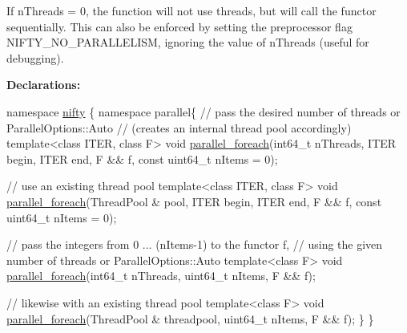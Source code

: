 If {\ttfamily n\+Threads = 0}, the function will not use threads, but will call the functor sequentially. This can also be enforced by setting the preprocessor flag {\ttfamily N\+I\+F\+T\+Y\+\_\+\+N\+O\+\_\+\+P\+A\+R\+A\+L\+L\+E\+L\+I\+SM}, ignoring the value of {\ttfamily n\+Threads} (useful for debugging).

{\bfseries  Declarations\+:}


\begin{DoxyCode}
\textcolor{keyword}{namespace }\hyperlink{namespacenifty}{nifty} \{
\textcolor{keyword}{namespace }parallel\{
    \textcolor{comment}{// pass the desired number of threads or ParallelOptions::Auto}
    \textcolor{comment}{// (creates an internal thread pool accordingly)}
    \textcolor{keyword}{template}<\textcolor{keyword}{class} ITER, \textcolor{keyword}{class} F>
    \textcolor{keywordtype}{void} \hyperlink{group__ParallelProcessing_ga505ac3d12ecde87341bce7b6f1027c88}{parallel\_foreach}(int64\_t nThreads,
                          ITER begin, ITER end,
                          F && f,
                          \textcolor{keyword}{const} uint64\_t nItems = 0);

    \textcolor{comment}{// use an existing thread pool}
    \textcolor{keyword}{template}<\textcolor{keyword}{class} ITER, \textcolor{keyword}{class} F>
    \textcolor{keywordtype}{void} \hyperlink{group__ParallelProcessing_ga505ac3d12ecde87341bce7b6f1027c88}{parallel\_foreach}(ThreadPool & pool,
                          ITER begin, ITER end,
                          F && f,
                          \textcolor{keyword}{const} uint64\_t nItems = 0);

    \textcolor{comment}{// pass the integers from 0 ... (nItems-1) to the functor f,}
    \textcolor{comment}{// using the given number of threads or ParallelOptions::Auto}
    \textcolor{keyword}{template}<\textcolor{keyword}{class} F>
    \textcolor{keywordtype}{void} \hyperlink{group__ParallelProcessing_ga505ac3d12ecde87341bce7b6f1027c88}{parallel\_foreach}(int64\_t nThreads,
                          uint64\_t nItems,
                          F && f);

    \textcolor{comment}{// likewise with an existing thread pool}
    \textcolor{keyword}{template}<\textcolor{keyword}{class} F>
    \textcolor{keywordtype}{void} \hyperlink{group__ParallelProcessing_ga505ac3d12ecde87341bce7b6f1027c88}{parallel\_foreach}(ThreadPool & threadpool,
                          uint64\_t nItems,
                          F && f);
\}
\}
\end{DoxyCode}


